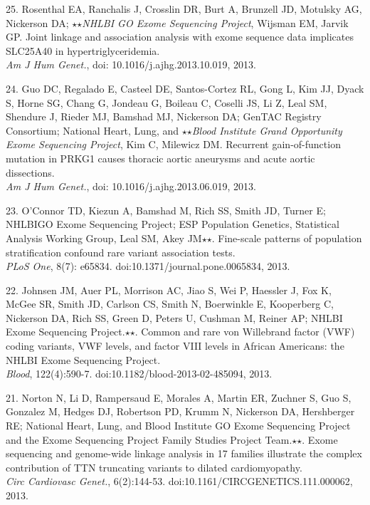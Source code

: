 \documentclass[margin,line]{cv}
\begin{document}
\begin{resume}
\begin{list}{*}{}
    \item[25.] Rosenthal EA, Ranchalis J, Crosslin DR, Burt A, Brunzell JD, Motulsky AG, Nickerson DA; $\star$$\star$\textit{NHLBI GO Exome Sequencing Project}, Wijsman EM, Jarvik GP.
    Joint linkage and association analysis with exome sequence data implicates SLC25A40 in hypertriglyceridemia.\\
    \emph{Am J Hum Genet.}, doi: 10.1016/j.ajhg.2013.10.019, 2013.

    \item[24.] Guo DC, Regalado E, Casteel DE, Santos-Cortez RL, Gong L, Kim JJ, Dyack S, Horne SG, Chang G, Jondeau G, Boileau C, Coselli JS, Li Z, Leal SM, Shendure J, Rieder MJ, Bamshad MJ, Nickerson DA; GenTAC Registry Consortium; National Heart, Lung, and $\star$$\star$\textit{Blood Institute Grand Opportunity Exome Sequencing Project}, Kim C, Milewicz DM.
    Recurrent gain-of-function mutation in PRKG1 causes thoracic aortic aneurysms and acute aortic dissections.\\
    \emph{Am J Hum Genet.}, doi: 10.1016/j.ajhg.2013.06.019, 2013.


    \item[23.] O'Connor TD, Kiezun A, Bamshad M, Rich SS, Smith JD, Turner E; NHLBIGO Exome Sequencing Project; ESP Population Genetics, Statistical Analysis Working Group, Leal SM, Akey JM$\star$$\star$. Fine-scale patterns of population stratification confound rare variant association tests.\\
    \emph{PLoS One}, 8(7): e65834. doi:10.1371/journal.pone.0065834, 2013.

    \item[22.] Johnsen JM, Auer PL, Morrison AC, Jiao S, Wei P, Haessler J, Fox K, McGee SR, Smith JD, Carlson CS, Smith N, Boerwinkle E, Kooperberg C, Nickerson DA, Rich SS, Green D, Peters U, Cushman M, Reiner AP; NHLBI Exome Sequencing Project.$\star$$\star$. Common and rare von Willebrand factor (VWF) coding variants, VWF levels, and factor VIII levels in African Americans: the NHLBI Exome Sequencing Project.\\
    \emph{Blood}, 122(4):590-7. doi:10.1182/blood-2013-02-485094, 2013.

    \item[21.] Norton N, Li D, Rampersaud E, Morales A, Martin ER, Zuchner S, Guo S, Gonzalez M, Hedges DJ, Robertson PD, Krumm N, Nickerson DA, Hershberger RE; National Heart, Lung, and Blood Institute GO Exome Sequencing Project and the Exome Sequencing Project Family Studies Project Team.$\star$$\star$. Exome sequencing and genome-wide linkage analysis in 17 families illustrate the complex contribution of TTN truncating variants to dilated cardiomyopathy.\\
    \emph{Circ Cardiovasc Genet.}, 6(2):144-53. doi:10.1161/CIRCGENETICS.111.000062, 2013.


\end{list}
\end{resume}
\end{document}
